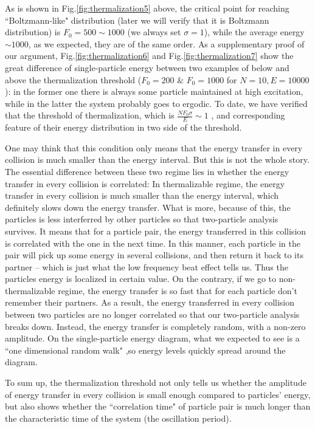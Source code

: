 \documentclass[aps,preprintnumbers,onecolumn,amsmath,amssymb,floatfix,pra]{revtex4-1}
\begin{document}
As is shown in Fig.\ref{fig:thermalization5} above, the critical point for reaching ``Boltzmann-like" distribution (later we will verify that it is Boltzmann distribution) is $F_0=500\sim1000$ (we always set $\sigma=1$), while the average energy $\sim 1000$, as we expected, they are of the same order. As a supplementary proof of our argument, Fig.\ref{fig:thermalization6} and Fig.\ref{fig:thermalization7} show the great difference of single-particle energy between two examples of below and above the thermalization threshold ($F_0=200$ $\&$ $F_0=1000$ for $N=10, E=10000$): in the former one there is always some particle maintained at high excitation, while in the latter the system probably goes to ergodic. To date, we have verified that the threshold of thermalization, which is $\frac{NF_0\sigma}{E}\sim1 $ , and corresponding feature of their energy distribution in two side of the threshold.

One may think that this condition only means that the energy transfer in every collision is much smaller than the energy interval. But this is not the whole story. The essential difference between these two regime lies in whether the energy transfer in every collision is correlated: In thermalizable regime, the energy transfer in every collision is much smaller than the energy interval, which definitely slows down the energy transfer. What is more, because of this, the particles is less interferred by other particles so that two-particle analysis survives. It means that for a particle pair, the energy transferred in this collision is correlated with the one in the next time. In this manner, each particle in the pair will pick up some energy in several collisions, and then return it back to its partner -- which is just what the low frequency beat effect tells us. Thus the particles energy is localized in certain value. On the contrary, if we go to non-thermalizable regime, the energy transfer is so fast that for each particle don't remember their partners. As a result, the energy transferred in every collision between two particles are no longer correlated so that our two-particle analysis breaks down. Instead, the energy transfer is completely random, with a non-zero amplitude. On the single-particle energy diagram, what we expected to see is a ``one dimensional random walk" ,so energy levels quickly spread around the diagram.

To sum up, the thermalization threshold not only tells us whether the amplitude of energy transfer in every collision is small enough compared to particles' energy, but also shows whether the ``correlation time" of particle pair is much longer than the characteristic time of the system (the oscillation period).  
\end{document}
